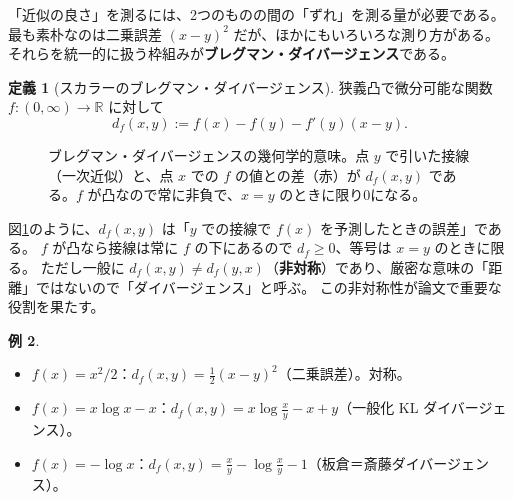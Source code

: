 \documentclass[a4paper,11pt]{ltjsarticle}
\theoremstyle{definition}
\newtheorem{definition}{定義}[section]
\newtheorem{example}[definition]{例}
\theoremstyle{plain}
\newcommand{\R}{\mathbb{R}}
\begin{document}
「近似の良さ」を測るには、2つのものの間の「ずれ」を測る量が必要である。
最も素朴なのは二乗誤差 $(x-y)^2$ だが、ほかにもいろいろな測り方がある。
それらを統一的に扱う枠組みが\textbf{ブレグマン・ダイバージェンス}である。

\begin{definition}[スカラーのブレグマン・ダイバージェンス]
狭義凸で微分可能な関数 $f:(0,\infty)\to\R$ に対して
\begin{equation}
  d_f(x, y) := f(x) - f(y) - f'(y)(x-y).
\end{equation}
\end{definition}

\begin{figure}[t]
\centering
{}
\caption{ブレグマン・ダイバージェンスの幾何学的意味。点 $y$ で引いた接線（一次近似）と、点 $x$ での $f$ の値との差（赤）が $d_f(x,y)$ である。$f$ が凸なので常に非負で、$x=y$ のときに限り0になる。}
\label{fig:bregman}
\end{figure}

図\ref{fig:bregman}のように、$d_f(x,y)$ は「$y$ での接線で $f(x)$ を予測したときの誤差」である。
$f$ が凸なら接線は常に $f$ の下にあるので $d_f\ge 0$、等号は $x=y$ のときに限る。
ただし一般に $d_f(x,y)\neq d_f(y,x)$（\textbf{非対称}）であり、厳密な意味の「距離」ではないので「ダイバージェンス」と呼ぶ。
この非対称性が論文で重要な役割を果たす。

\begin{example}
\begin{itemize}
  \item $f(x) = x^2/2$：$d_f(x,y) = \frac12(x-y)^2$（二乗誤差）。対称。
  \item $f(x) = x\log x - x$：$d_f(x,y) = x\log\frac xy - x + y$（一般化 KL ダイバージェンス）。
  \item $f(x) = -\log x$：$d_f(x,y) = \frac xy - \log\frac xy - 1$（板倉＝斎藤ダイバージェンス）。
\end{itemize}
\end{example}
\end{document}
